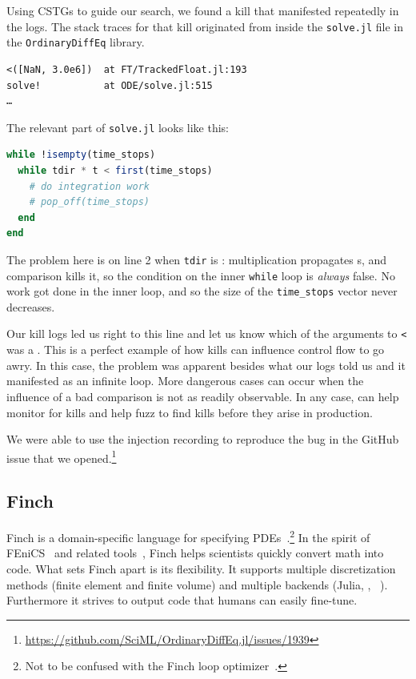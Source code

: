\documentclass{juliacon}
\begin{document}
Using CSTGs to guide our search, we found a \NaN{} kill that manifested repeatedly in the logs.
The stack traces for that kill originated from inside the \texttt{solve.jl} file in the \texttt{OrdinaryDiffEq} library.

\begin{verbatim}
<([NaN, 3.0e6])  at FT/TrackedFloat.jl:193
solve!           at ODE/solve.jl:515
…
\end{verbatim}

The relevant part of \texttt{solve.jl} looks like this:


\begin{lstlisting}[language = Julia]
while !isempty(time_stops)
  while tdir * t < first(time_stops)
    # do integration work
    # pop_off(time_stops)
  end
end
\end{lstlisting}

The problem here is on line 2 when \texttt{tdir} is \NaN{}: multiplication propagates \NaN{}s, and comparison kills it, so the condition on the inner \texttt{while} loop is \emph{always} false.
No work got done in the inner loop, and so the size of the \texttt{time\_stops} vector never decreases.

Our kill logs led us right to this line and let us know which of the arguments to \texttt{<} was a \NaN{}.
This is a perfect example of how \NaN{} kills can influence control flow to go awry.
In this case, the problem was apparent besides what our logs told us and it manifested as an infinite loop.
More dangerous cases can occur when the influence of a bad comparison is not as readily observable.
In any case, \FT{} can help monitor for kills and help fuzz to find kills before they arise in production.

We were able to use the injection recording to reproduce the bug in the GitHub issue that we opened.\footnote{\url{https://github.com/SciML/OrdinaryDiffEq.jl/issues/1939}}

\subsection{Finch}
\label{s:finch}

Finch is a domain-specific language for specifying
PDEs~\cite{heislerFinchDomainSpecific2022}.\footnote{Not to be confused
with the Finch loop optimizer~\cite{adka-cgo-2023}.}
In the spirit of FEniCS~\cite{fenics} and related
tools~\cite{freefem,openfoam,dune,firedrake},
Finch helps scientists quickly convert math into code.
What sets Finch apart is its flexibility.
It supports multiple discretization methods (finite element and finite
volume) and multiple backends (Julia, \CPP{}, \Dendro{}~\cite{dendro}).
Furthermore it strives to output code that humans can easily fine-tune.
\end{document}
